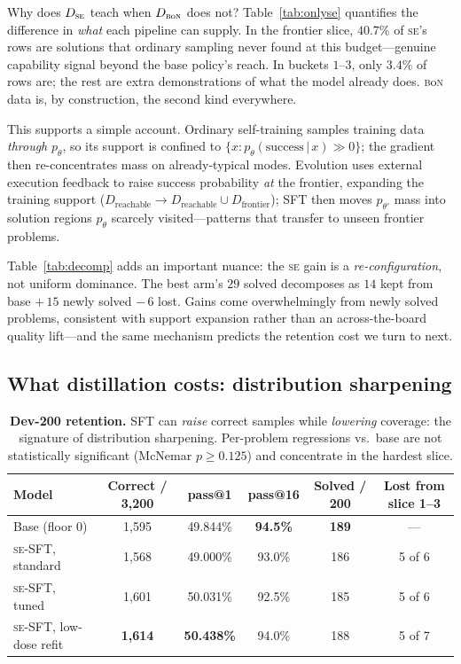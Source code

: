 \documentclass{article}
\makeatletter
\newcommand{\se}{\textnormal{\textsc{se}}}
\newcommand{\bon}{\textnormal{\textsc{b}o\textsc{n}}}
\newcommand{\pass}[1]{pass@#1}
\makeatother
\begin{document}
Why does $D_{\se{}}$ teach when $D_{\bon{}}$ does not? Table~\ref{tab:onlyse} quantifies the difference in \emph{what} each pipeline can supply. In the frontier slice, $40.7\%$ of \se{}'s rows are solutions that ordinary sampling never found at this budget---genuine capability signal beyond the base policy's reach. In buckets $1$--$3$, only $3.4\%$ of rows are; the rest are extra demonstrations of what the model already does. \bon{} data is, by construction, the second kind everywhere.

This supports a simple account. Ordinary self-training samples training data \emph{through} $p_\theta$, so its support is confined to $\{x : p_\theta(\text{success}\,|\,x) \gg 0\}$; the gradient then re-concentrates mass on already-typical modes. Evolution uses external execution feedback to raise success probability \emph{at} the frontier, expanding the training support ($D_{\text{reachable}} \to D_{\text{reachable}} \cup D_{\text{frontier}}$); SFT then moves $p_{\theta'}$ mass into solution regions $p_\theta$ scarcely visited---patterns that transfer to unseen frontier problems.

Table~\ref{tab:decomp} adds an important nuance: the \se{} gain is a \emph{re-configuration}, not uniform dominance. The best arm's $29$ solved decomposes as $14$ kept from base $+\,15$ newly solved $-\,6$ lost. Gains come overwhelmingly from newly solved problems, consistent with support expansion rather than an across-the-board quality lift---and the same mechanism predicts the retention cost we turn to next.

\subsection{What distillation costs: distribution sharpening}
\label{sec:cost}

\begin{table}[t]
\caption{\textbf{Dev-200 retention.} SFT can \emph{raise} correct samples while \emph{lowering} coverage: the signature of distribution sharpening. Per-problem regressions vs.\ base are not statistically significant (McNemar $p \geq 0.125$) and concentrate in the hardest slice.}
\label{tab:dev}
\centering
\small
\begin{tabular}{lccccc}
\toprule
Model & Correct / 3{,}200 & \pass{1} & \pass{16} & Solved / 200 & Lost from slice 1--3 \\
\midrule
Base (floor $0$) & 1{,}595 & 49.844\% & \textbf{94.5\%} & \textbf{189} & --- \\
\se{}-SFT, standard & 1{,}568 & 49.000\% & 93.0\% & 186 & 5 of 6 \\
\se{}-SFT, tuned & 1{,}601 & 50.031\% & 92.5\% & 185 & 5 of 6 \\
\se{}-SFT, low-dose refit & \textbf{1{,}614} & \textbf{50.438\%} & 94.0\% & 188 & 5 of 7 \\
\bottomrule
\end{tabular}
\end{table}
\end{document}

